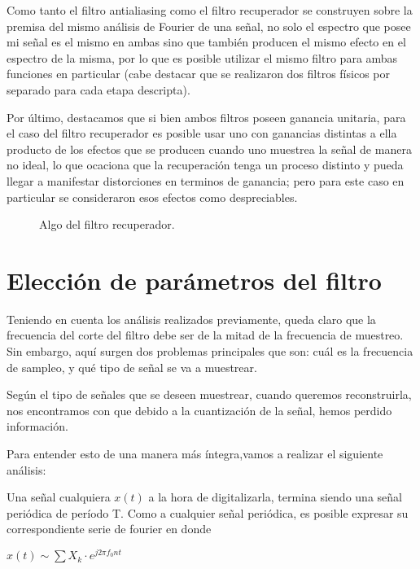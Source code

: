 \documentclass[../../ASSD_TP1_G7.tex]{subfiles}
\begin{document}
Como tanto el filtro antialiasing como el filtro recuperador se construyen
sobre la premisa del mismo análisis de Fourier de una señal, no solo
el espectro que posee mi señal es el mismo en ambas sino que también
producen el mismo efecto en el espectro de la misma, por lo que es
posible utilizar el mismo filtro para ambas funciones en particular
(cabe destacar que se realizaron dos filtros físicos por separado
para cada etapa descripta). 

Por último, destacamos que si bien ambos filtros poseen ganancia unitaria,
para el caso del filtro recuperador es posible usar uno con ganancias
distintas a ella producto de los efectos que se producen cuando uno
muestrea la señal de manera no ideal, lo que ocaciona que la recuperación
tenga un proceso distinto y pueda llegar a manifestar distorciones
en terminos de ganancia; pero para este caso en particular se consideraron
esos efectos como despreciables.

\begin{figure}[H]

\caption{Algo del filtro recuperador.}

\end{figure}


\section{Elección de parámetros del filtro}

Teniendo en cuenta los análisis realizados previamente, queda claro
que la frecuencia del corte del filtro debe ser de la mitad de la
frecuencia de muestreo. Sin embargo, aquí surgen dos problemas principales
que son: cuál es la frecuencia de sampleo, y qué tipo de señal se
va a muestrear.

Según el tipo de señales que se deseen muestrear, cuando queremos
reconstruirla, nos encontramos con que debido a la cuantización de
la señal, hemos perdido información. 

Para entender esto de una manera más íntegra,vamos a realizar el siguiente
análisis:

Una señal cualquiera $x(t)$ a la hora de digitalizarla, termina siendo
una señal periódica de período T. Como a cualquier señal periódica,
es posible expresar su correspondiente serie de fourier en donde
\begin{center}
\textit{\Large{}$x(t)\sim\sum X_{k}\cdot e^{j2\pi f_{0}nt}$}{\Large\par}
\par\end{center}
\end{document}
